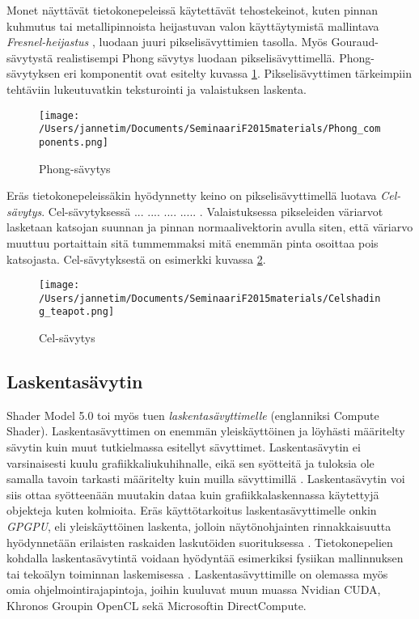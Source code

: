 \documentclass[finnish]{tktltiki2}
\theoremstyle{definition}
\theoremstyle{remark}
\begin{document}
Monet näyttävät tietokonepeleissä käytettävät tehostekeinot, kuten pinnan kuhmutus tai metallipinnoista heijastuvan valon käyttäytymistä mallintava \emph{Fresnel-heijastus} \cite{Laz05}, luodaan juuri pikselisävyttimien tasolla. Myös Gouraud-sävytystä realistisempi Phong sävytys luodaan pikselisävyttimellä. Phong-sävytyksen eri komponentit ovat esitelty kuvassa \ref{Phong}. Pikselisävyttimen tärkeimpiin tehtäviin lukeutuvatkin teksturointi ja valaistuksen laskenta.

\begin{figure}[!htbp]
\texttt{[image: /Users/jannetim/Documents/SeminaariF2015materials/Phong\_components.png]}
\caption{Phong-sävytys}
\label{Phong}
\end{figure}

Eräs tietokonepeleissäkin hyödynnetty keino on pikselisävyttimellä luotava \emph{Cel-sävytys}. Cel-sävytyksessä  ... .... .... ..... . Valaistuksessa pikseleiden väriarvot lasketaan katsojan suunnan ja pinnan normaalivektorin avulla siten, että väriarvo muuttuu portaittain sitä tummemmaksi mitä enemmän pinta osoittaa pois katsojasta. Cel-sävytyksestä on esimerkki kuvassa \ref{Cel}.

\begin{figure}[!htbp]
\texttt{[image: /Users/jannetim/Documents/SeminaariF2015materials/Celshading\_teapot.png]}
\caption{Cel-sävytys}
\label{Cel}
\end{figure}

\subsection{Laskentasävytin}

Shader Model 5.0 toi myös tuen \emph{laskentasävyttimelle} (englanniksi Compute Shader). Laskentasävyttimen on enemmän yleiskäyttöinen ja löyhästi määritelty sävytin kuin muut tutkielmassa esitellyt sävyttimet. Laskentasävytin ei varsinaisesti kuulu grafiikkaliukuhihnalle, eikä sen syötteitä ja tuloksia ole samalla tavoin tarkasti määritelty kuin muilla sävyttimillä \cite{Kes14}. Laskentasävytin voi siis ottaa syötteenään muutakin dataa kuin grafiikkalaskennassa käytettyjä objekteja kuten kolmioita. Eräs käyttötarkoitus laskentasävyttimelle onkin \emph{GPGPU}, eli yleiskäyttöinen laskenta, jolloin näytönohjainten rinnakkaisuutta hyödynnetään erilaisten raskaiden laskutöiden suorituksessa \cite{Uni15}. Tietokonepelien kohdalla laskentasävytintä voidaan hyödyntää esimerkiksi fysiikan mallinnuksen tai tekoälyn toiminnan laskemisessa \cite[Luku: Compute Shader Overview]{Mic11}. Laskentasävyttimille on olemassa myös omia ohjelmointirajapintoja, joihin kuuluvat muun muassa Nvidian CUDA, Khronos Groupin OpenCL sekä Microsoftin DirectCompute.
\end{document}

